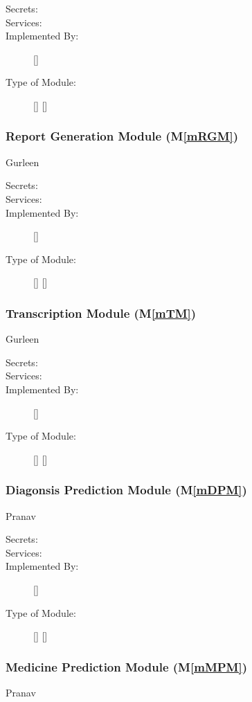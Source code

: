 \documentclass[12pt, titlepage]{article}
\newcommand{\mref}[1]{M\ref{#1}}
\begin{document}
\begin{description}
\item[Secrets:]
\item[Services:]
\item[Implemented By:] []
\item[Type of Module:] []
  []
\end{description}

\subsubsection{Report Generation Module (\mref{mRGM})} Gurleen

\begin{description}
\item[Secrets:]
\item[Services:]
\item[Implemented By:] []
\item[Type of Module:] []
  []
\end{description}

\subsubsection{Transcription Module (\mref{mTM})} Gurleen

\begin{description}
\item[Secrets:]
\item[Services:]
\item[Implemented By:] []
\item[Type of Module:] []
  []
\end{description}

\subsubsection{Diagonsis Prediction Module (\mref{mDPM})} Pranav

\begin{description}
\item[Secrets:]
\item[Services:]
\item[Implemented By:] []
\item[Type of Module:] []
  []
\end{description}

\subsubsection{Medicine Prediction Module (\mref{mMPM})} Pranav
\end{document}
